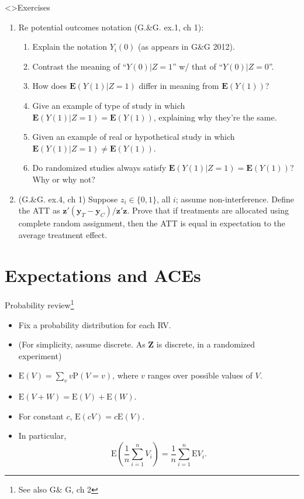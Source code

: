 \begin{frame}<\nottheirhandout>{Exercises}
  \begin{enumerate}
  \item Re potential outcomes notation {}(G.\&G. ex.1, ch 1):
    \begin{enumerate}
    \item Explain the notation $Y_{i}(0)$ (as appears in G\&G 2012).
    \item Contrast the meaning of ``$Y(0) | Z=1$'' w/ that of ``$Y(0) | Z=0$''.
    \item How does $\mathbf{E}(Y(1) | Z=1)$ differ in meaning from $\mathbf{E}(Y(1))$?
    \item Give an example of type of study in which $\mathbf{E}(Y(1) | Z=1) = \mathbf{E}(Y(1))$, explaining why they're the same.
    \item Given an example of real or hypothetical study in which $\mathbf{E}(Y(1) | Z=1) \neq \mathbf{E}(Y(1))$.
    \item Do randomized studies always satisfy $\mathbf{E}(Y(1) | Z=1) = \mathbf{E}(Y(1))$?  Why or why not?
    \end{enumerate}
\item (G.\&G. ex.4, ch 1) Suppose $z_{i} \in \{0,1\}$, all $i$; assume non-interference. Define the ATT as $\mathbf{z}'(\mathbf{y}_{T}-\mathbf{y}_{C})/\mathbf{z}'\mathbf{z}$.  Prove that if treatments are allocated using complete random assignment, then the ATT is equal in expectation to the average treatment effect.
  \end{enumerate}

\end{frame}

\section{Expectations and ACEs}

\begin{frame}{Probability review\footnote{See also G\& G, ch 2}}

  \begin{itemize}
  \item Fix a probability distribution for each RV.
  \item (For simplicity, assume discrete.  As $\mathbf{Z}$ is discrete, in a randomized experiment)
  \item  $\mathrm{E}(V) = \sum_v v\mathrm{P}(V=v) $, where $v$ ranges over possible values of $V$.
  \item $\mathrm{E}(V + W) = \mathrm{E}(V) + \mathrm{E}(W)$.
  \item For constant $c$, $\mathrm{E}(cV) = c\mathrm{E}(V)$.
  \item In particular, 
$$\mathrm{E}\left(\frac{1}{n} \sum_{i=1}^n V_i\right) = \frac{1}{n} \sum_{i=1}^n \mathrm{E} V_i.$$
  \end{itemize}


\end{frame}

